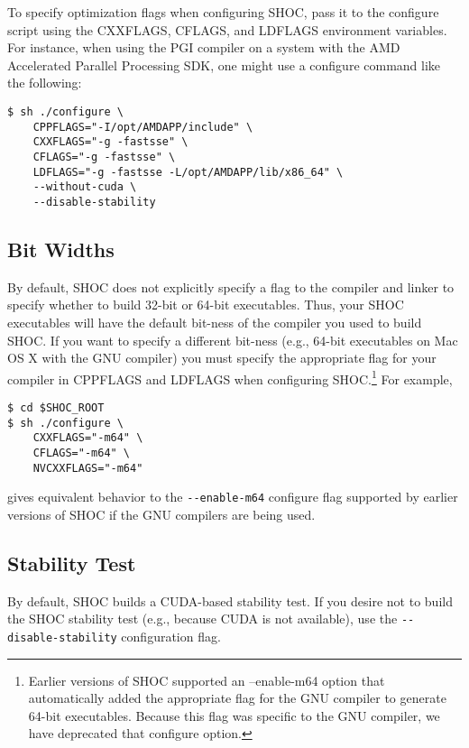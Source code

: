 \documentclass[11pt]{article}
\begin{document}
To specify optimization flags when configuring SHOC, pass it to the
configure script using the CXXFLAGS, CFLAGS, and LDFLAGS environment variables.
For instance, when using the PGI compiler on a system with the 
AMD Accelerated Parallel Processing SDK, one might use a configure command 
like the following:

\begin{Verbatim}[frame=single]
$ sh ./configure \
    CPPFLAGS="-I/opt/AMDAPP/include" \
    CXXFLAGS="-g -fastsse" \
    CFLAGS="-g -fastsse" \
    LDFLAGS="-g -fastsse -L/opt/AMDAPP/lib/x86_64" \
    --without-cuda \
    --disable-stability
\end{Verbatim}


\subsection{Bit Widths}\label{sec:confbitwidth}

By default, SHOC does not explicitly specify a flag to the compiler and 
linker to specify whether to build 32-bit or 64-bit executables.
Thus, your SHOC executables will have the default bit-ness of the compiler 
you used to build SHOC.
If you want to specify a different bit-ness (e.g., 64-bit executables on 
Mac OS X with the GNU compiler) you must specify the appropriate flag
for your compiler in CPPFLAGS and LDFLAGS when configuring 
SHOC.\footnote{Earlier versions of SHOC supported an --enable-m64 option 
that automatically added the appropriate flag for the GNU compiler to generate
64-bit executables.  Because this flag was specific to the GNU compiler, we have
deprecated that configure option.}
For example,
\begin{Verbatim}[frame=single]
$ cd $SHOC_ROOT
$ sh ./configure \
    CXXFLAGS="-m64" \
    CFLAGS="-m64" \
    NVCXXFLAGS="-m64"
\end{Verbatim}
\noindent gives equivalent behavior to the \verb+--enable-m64+ configure flag
supported by earlier versions of SHOC if the GNU compilers are being used.

\subsection{Stability Test}\label{sec:confstability}

By default, SHOC builds a CUDA-based stability test.
If you desire not to build the SHOC stability test (e.g., because CUDA is
not available), use the \verb+--disable-stability+ configuration flag.
\end{document}
